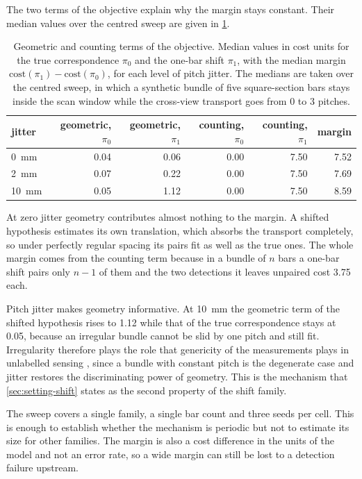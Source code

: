 \documentclass[a4paper, 12pt, twoside]{book}
\newcommand{\citev}[1]{\citeauthor{#1} \citeyear{#1} \cite{#1}}
\begin{document}
The two terms of the objective explain why the margin stays constant. Their median values over the centred sweep are given in \cref{tab:margin-terms}.

\begin{table}[htbp]
\centering
\caption[Geometric and counting terms of the objective]{Geometric and counting terms of the objective. Median values in cost units for the true correspondence $\pi_0$ and the one-bar shift $\pi_1$, with the median margin $\mathrm{cost}(\pi_1) - \mathrm{cost}(\pi_0)$, for each level of pitch jitter. The medians are taken over the centred sweep, in which a synthetic bundle of five square-section bars stays inside the scan window while the cross-view transport goes from 0 to 3 pitches.}
\label{tab:margin-terms}
\begin{tabular}{@{}lrrrrr@{}}
\toprule
jitter & geometric, $\pi_0$ & geometric, $\pi_1$ & counting, $\pi_0$ & counting, $\pi_1$ & margin \\
\midrule
0~mm & 0.04 & 0.06 & 0.00 & 7.50 & 7.52 \\
2~mm & 0.07 & 0.22 & 0.00 & 7.50 & 7.69 \\
10~mm & 0.05 & 1.12 & 0.00 & 7.50 & 8.59 \\
\bottomrule
\end{tabular}
\end{table}

At zero jitter geometry contributes almost nothing to the margin. A shifted hypothesis estimates its own translation, which absorbs the transport completely, so under perfectly regular spacing its pairs fit as well as the true ones. The whole margin comes from the counting term because in a bundle of $n$ bars a one-bar shift pairs only $n-1$ of them and the two detections it leaves unpaired cost 3.75 each.

Pitch jitter makes geometry informative. At 10~mm the geometric term of the shifted hypothesis rises to 1.12 while that of the true correspondence stays at 0.05, because an irregular bundle cannot be slid by one pitch and still fit. Irregularity therefore plays the role that genericity of the measurements plays in unlabelled sensing \citev{unnikrishnan2018}, since a bundle with constant pitch is the degenerate case and jitter restores the discriminating power of geometry. This is the mechanism that \cref{sec:setting-shift} states as the second property of the shift family.

The sweep covers a single family, a single bar count and three seeds per cell. This is enough to establish whether the mechanism is periodic but not to estimate its size for other families. The margin is also a cost difference in the units of the model and not an error rate, so a wide margin can still be lost to a detection failure upstream.
\end{document}
